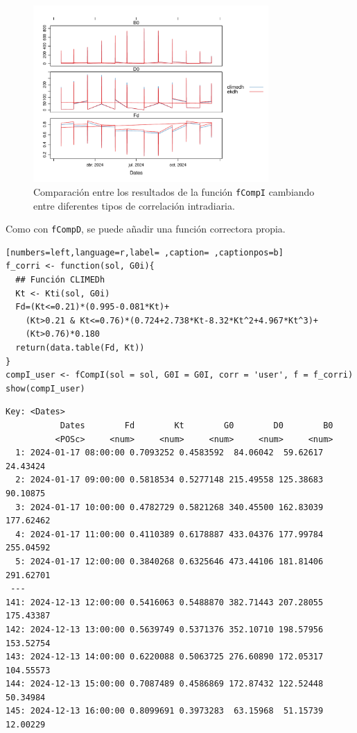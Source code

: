 \begin{itemize}
\begin{figure}[!htb]
\centering
\includegraphics[width=0.8\textwidth]{figuras/codigo-compicorr.pdf}
\caption{Comparación entre los resultados de la función \texttt{fCompI} cambiando entre diferentes tipos de correlación intradiaria.}
\end{figure}
\FloatBarrier
Como con \texttt{fCompD}, se puede añadir una función correctora propia.
\begin{lstlisting}[numbers=left,language=r,label= ,caption= ,captionpos=b]
f_corri <- function(sol, G0i){
  ## Función CLIMEDh
  Kt <- Kti(sol, G0i)
  Fd=(Kt<=0.21)*(0.995-0.081*Kt)+
    (Kt>0.21 & Kt<=0.76)*(0.724+2.738*Kt-8.32*Kt^2+4.967*Kt^3)+
    (Kt>0.76)*0.180
  return(data.table(Fd, Kt))
}
compI_user <- fCompI(sol = sol, G0I = G0I, corr = 'user', f = f_corri)
show(compI_user)
\end{lstlisting}

\begin{verbatim}
Key: <Dates>
		   Dates        Fd        Kt        G0        D0        B0
		  <POSc>     <num>     <num>     <num>     <num>     <num>
  1: 2024-01-17 08:00:00 0.7093252 0.4583592  84.06042  59.62617  24.43424
  2: 2024-01-17 09:00:00 0.5818534 0.5277148 215.49558 125.38683  90.10875
  3: 2024-01-17 10:00:00 0.4782729 0.5821268 340.45500 162.83039 177.62462
  4: 2024-01-17 11:00:00 0.4110389 0.6178887 433.04376 177.99784 255.04592
  5: 2024-01-17 12:00:00 0.3840268 0.6325646 473.44106 181.81406 291.62701
 ---                                                                      
141: 2024-12-13 12:00:00 0.5416063 0.5488870 382.71443 207.28055 175.43387
142: 2024-12-13 13:00:00 0.5639749 0.5371376 352.10710 198.57956 153.52754
143: 2024-12-13 14:00:00 0.6220088 0.5063725 276.60890 172.05317 104.55573
144: 2024-12-13 15:00:00 0.7087489 0.4586869 172.87432 122.52448  50.34984
145: 2024-12-13 16:00:00 0.8099691 0.3973283  63.15968  51.15739  12.00229
\end{verbatim}


\end{itemize}
